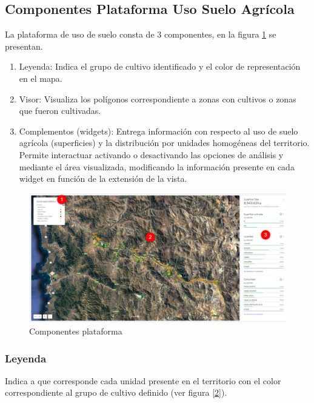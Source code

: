 \documentclass[10pt]{article}
\begin{document}
\subsection{Componentes Plataforma Uso Suelo Agrícola}
\label{2.1}

La plataforma de uso de suelo consta de 3 componentes, en la figura \ref{1} se presentan.

\begin{enumerate}
\item Leyenda: Indica el grupo de cultivo identificado y el color de representación en el mapa.
\item Visor: Visualiza los polígonos correspondiente a zonas con cultivos o zonas que fueron cultivadas.
\item	Complementos (widgets): Entrega información con respecto al uso de suelo agrícola (superficies) y la distribución por unidades homogéneas del territorio. Permite interactuar activando o desactivando las opciones de análisis y mediante el área visualizada, modificando la información presente en cada widget en función de la extensión de la vista.

\end{enumerate}

\begin{figure}[H]
\centering
\includegraphics[width=\textwidth]{Figuras_manual/componentesvisor12.png}
\caption{Componentes plataforma}
\label{1}
\end{figure}

\subsubsection{Leyenda}
Indica a que corresponde cada unidad presente en el territorio con el color correspondiente al grupo de cultivo definido (ver figura \ref{2}).
\end{document}
